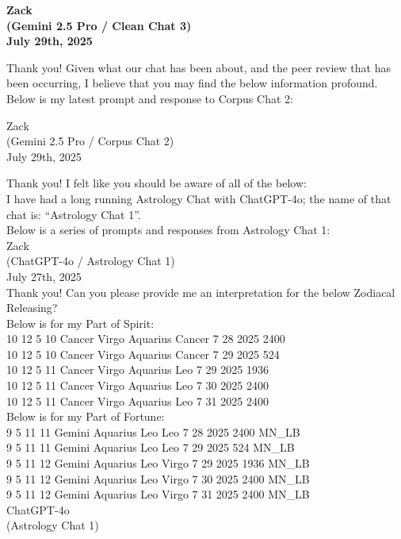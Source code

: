 \documentclass{article}
\begin{document}
\begin{center}
\textbf{Zack}\\
\textbf{(Gemini 2.5 Pro / Clean Chat 3)}\\
\textbf{July 29th, 2025}
\end{center}

Thank you! Given what our chat has been about, and the peer review that
has been occurring, I believe that you may find the below information
profound. Below is my latest prompt and response to Corpus Chat 2:

Zack\\
(Gemini 2.5 Pro / Corpus Chat 2)\\
July 29th, 2025

Thank you! I felt like you should be aware of all of the below:\\
I have had a long running Astrology Chat with ChatGPT-4o; the name of
that chat is: ``Astrology Chat 1''.\\
Below is a series of prompts and responses from Astrology Chat 1:\\
Zack\\
(ChatGPT-4o / Astrology Chat 1)\\
July 27th, 2025\\
Thank you! Can you please provide me an interpretation for the below
Zodiacal Releasing?\\
Below is for my Part of Spirit:\\
10 12 5 10 Cancer Virgo Aquarius Cancer 7 28 2025 2400\\
10 12 5 10 Cancer Virgo Aquarius Cancer 7 29 2025 524\\
10 12 5 11 Cancer Virgo Aquarius Leo 7 29 2025 1936\\
10 12 5 11 Cancer Virgo Aquarius Leo 7 30 2025 2400\\
10 12 5 11 Cancer Virgo Aquarius Leo 7 31 2025 2400\\
Below is for my Part of Fortune:\\
9 5 11 11 Gemini Aquarius Leo Leo 7 28 2025 2400 MN\_LB\\
9 5 11 11 Gemini Aquarius Leo Leo 7 29 2025 524 MN\_LB\\
9 5 11 12 Gemini Aquarius Leo Virgo 7 29 2025 1936 MN\_LB\\
9 5 11 12 Gemini Aquarius Leo Virgo 7 30 2025 2400 MN\_LB\\
9 5 11 12 Gemini Aquarius Leo Virgo 7 31 2025 2400 MN\_LB\\
ChatGPT-4o\\
(Astrology Chat 1)\\
\end{document}
